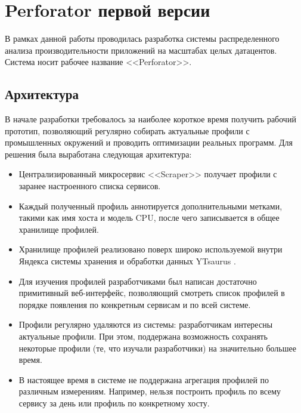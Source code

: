 \section{Perforator первой версии}
В рамках данной работы проводилась разработка системы распределенного анализа производительности приложений на масштабах целых датацентов.
Система носит рабочее название <<Perforator>>.

\subsection{Архитектура}
В начале разработки требовалось за наиболее короткое время получить рабочий прототип,
позволяющий регулярно собирать актуальные профили с промышленных окружений и проводить
оптимизации реальных программ. Для решения была выработана следующая архитектура:

\begin{itemize}
    \item
        Централизированный микросервис <<Scraper>> получает профили с заранее настроенного списка сервисов.

    \item
        Каждый полученный профиль аннотируется дополнительными метками, такими как имя хоста и модель CPU, после чего записывается в общее хранилище профилей.

    \item
        Хранилище профилей реализовано поверх широко используемой внутри Яндекса системы хранения и обработки данных YTsaurus \cite{yt}.

    \item
        Для изучения профилей разработчиками был написан достаточно примитивный веб-интерфейс, позволяющий смотреть список профилей
        в порядке появления по конкретным сервисам и по всей системе.

    \item
        Профили регулярно удаляются из системы: разработчикам интересны актуальные профили.
        При этом, поддержана возможность сохранять некоторые профили (те, что изучали разработчики) на значительно большее время.

    \item
        В настоящее время в системе не поддержана агрегация профилей по различным измерениям.
        Например, нельзя построить профиль по всему сервису за день или профиль по конкретному хосту.

\end{itemize}

